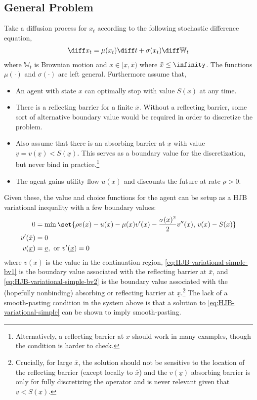 \documentclass[11pt]{etk-article}
\begin{document}
\subsection{General Problem}
Take a diffusion process for $x_t$ according to the following stochastic difference equation,
\begin{align}
\diff x_t = \mu(x_t)\diff t + \sigma(x_t)\diff\mathbb{W}_t\label{eq:x-SDE}
\end{align}
where $\mathbb{W}_t$ is Brownian motion and $x \in [\underline{x}, \bar{x})$ where $\bar{x} \leq \infinity$.  The functions $\mu(\cdot)$ and $\sigma(\cdot)$ are left general.  Furthermore assume that,
\begin{itemize}
	\item An agent with state $x$ can optimally stop with value $S(x)$ at any time.
	\item There is a reflecting barrier for a finite $\bar{x}$.  Without a reflecting barrier, some sort of alternative boundary value would be required in order to discretize the problem.
	\item Also assume that there is an absorbing barrier at $\underline{x}$ with value $\underline{v} = v(\underline{x}) < S(\underline{x}) $.  This serves as a boundary value for the discretization, but never bind in practice.\footnote{Alternatively, a reflecting barrier at $\underline{x}$ should work in many examples, though the condition is harder to check.}
	\item The agent gains utility flow $u(x)$ and discounts the future at rate $\rho > 0$.
\end{itemize}

Given these, the value and choice functions for the agent can be setup as a HJB variational inequality with a few boundary values:
\begin{align}
	0 &= \min\set{\rho v(x) - u(x) - \mu(x)v'(x) - \frac{\sigma(x)^2}{2}v''(x),\, v(x) - S(x) }\label{eq:HJB-variational-simple}\\
	v'(\bar{x}) &= 0\label{eq:HJB-variational-simple-bv1}\\
	v(\underline{x}) &= \underline{v}, \text{ or } v'(\underline{x}) = 0\label{eq:HJB-variational-simple-bv2}
\end{align}
where $v(x)$ is the value in the continuation region, \cref{eq:HJB-variational-simple-bv1} is the boundary value associated with the reflecting barrier at $\bar{x}$, and \cref{eq:HJB-variational-simple-bv2} is the boundary value associated with the (hopefully nonbinding) absorbing or reflecting barrier at $\underline{x}$.\footnote{Crucially, for large $\bar{x}$, the solution should not be sensitive to the location of the reflecting barrier (except locally to $\bar{x}$) and the $v(\underline{x})$ absorbing barrier is only for fully discretizing the operator and is never relevant given that $\underline{v} < S(\underline{x})$.}  The lack of a smooth-pasting condition in the system above is that a solution to \cref{eq:HJB-variational-simple} can be shown to imply smooth-pasting.
\end{document}
